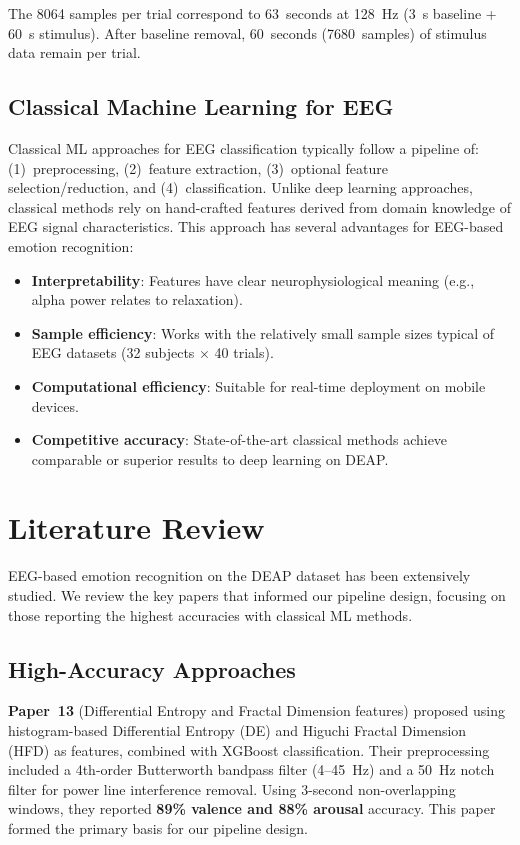 \documentclass[12pt,a4paper]{report}
\begin{document}
The 8064 samples per trial correspond to 63~seconds at 128~Hz (3~s baseline +
60~s stimulus). After baseline removal, 60~seconds (7680~samples) of stimulus
data remain per trial.

\subsection{Classical Machine Learning for EEG}

Classical ML approaches for EEG classification typically follow a pipeline of:
(1)~preprocessing, (2)~feature extraction, (3)~optional feature
selection/reduction, and (4)~classification. Unlike deep learning approaches,
classical methods rely on hand-crafted features derived from domain knowledge
of EEG signal characteristics. This approach has several advantages for
EEG-based emotion recognition:

\begin{itemize}[noitemsep]
    \item \textbf{Interpretability}: Features have clear neurophysiological
          meaning (e.g., alpha power relates to relaxation).
    \item \textbf{Sample efficiency}: Works with the relatively small sample
          sizes typical of EEG datasets (32 subjects $\times$ 40 trials).
    \item \textbf{Computational efficiency}: Suitable for real-time deployment
          on mobile devices.
    \item \textbf{Competitive accuracy}: State-of-the-art classical methods
          achieve comparable or superior results to deep learning on DEAP.
\end{itemize}


\section{Literature Review}
\label{sec:literature}

EEG-based emotion recognition on the DEAP dataset has been extensively studied.
We review the key papers that informed our pipeline design, focusing on those
reporting the highest accuracies with classical ML methods.

\subsection{High-Accuracy Approaches}

\textbf{Paper~13} (Differential Entropy and Fractal Dimension features)
proposed using histogram-based Differential Entropy (DE) and Higuchi Fractal
Dimension (HFD) as features, combined with XGBoost classification. Their
preprocessing included a 4th-order Butterworth bandpass filter (4--45~Hz) and
a 50~Hz notch filter for power line interference removal. Using 3-second
non-overlapping windows, they reported \textbf{89\% valence and 88\% arousal}
accuracy. This paper formed the primary basis for our pipeline design.
\end{document}
